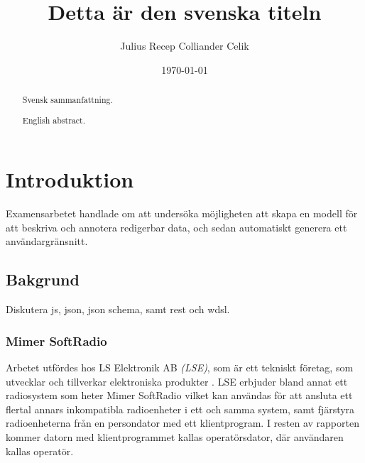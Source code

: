 \documentclass[swedish]{kththesis}
\begin{document}
\title{Detta är den svenska titeln}
\author{Julius Recep Colliander Celik}
\date{\today}

\frontmatter

\titlepage

\begin{abstract}
  Svensk sammanfattning.

\end{abstract}


\begin{otherlanguage}{english}
  \begin{abstract}
    English abstract.

  \end{abstract}
\end{otherlanguage}


\tableofcontents


\mainmatter


\chapter{Introduktion}
Examensarbetet handlade om att undersöka möjligheten att skapa en modell för att beskriva och annotera redigerbar data, och sedan automatiskt generera ett användargränsnitt. 


\section{Bakgrund}
Diskutera js, json, json schema, samt rest och wdsl.

\subsection{Mimer SoftRadio}
Arbetet utfördes hos LS Elektronik AB \textit{(LSE)}, som är ett tekniskt företag, som utvecklar och tillverkar elektroniska produkter \cite{Ehne}. LSE erbjuder bland annat ett radiosystem som heter Mimer SoftRadio vilket kan användas för att ansluta ett flertal annars inkompatibla radioenheter i ett och samma system, samt fjärstyra radioenheterna från en persondator med ett klientprogram. I resten av rapporten kommer datorn med klientprogrammet kallas operatörsdator, där användaren kallas operatör.
\end{document}
